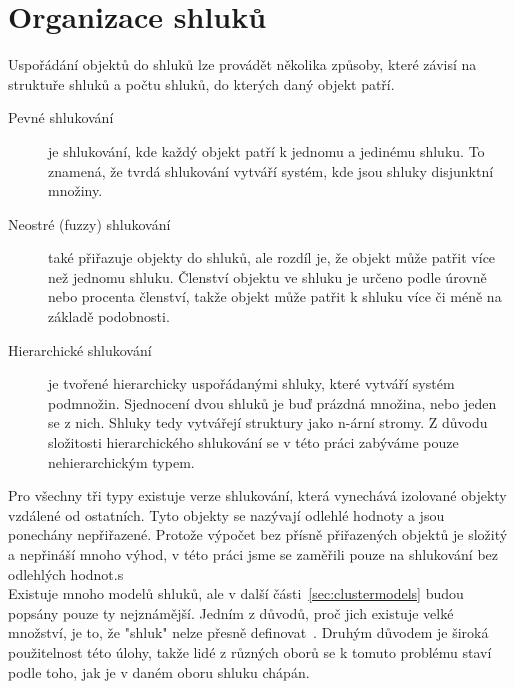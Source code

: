 \section{Organizace shluků} \label{sec:clusterorganization}
Uspořádání objektů do shluků lze provádět několika způsoby, které závisí na struktuře shluků a počtu shluků, do kterých daný objekt patří.
\begin{description}
\item[Pevné shlukování] je shlukování, kde každý objekt patří k jednomu a jedinému shluku. To znamená, že tvrdá shlukování vytváří systém, kde jsou shluky disjunktní množiny.
\item[Neostré (fuzzy) shlukování] také přiřazuje objekty do shluků, ale rozdíl je, že objekt může patřit více než jednomu shluku. Členství objektu ve shluku je určeno podle úrovně nebo procenta členství, takže objekt může patřit k shluku více či méně na základě podobnosti.
\item[Hierarchické shlukování] je tvořené hierarchicky uspořádanými shluky, které vytváří systém podmnožin. Sjednocení dvou shluků je buď prázdná množina, nebo jeden se z nich. Shluky tedy vytvářejí struktury jako n-ární stromy. Z důvodu složitosti hierarchického shlukování se v této práci zabýváme pouze nehierarchickým typem.
\end{description}
Pro všechny tři typy existuje verze shlukování, která vynechává izolované objekty vzdálené od ostatních. Tyto objekty se nazývají odlehlé hodnoty a jsou ponechány nepřiřazené. Protože výpočet bez přísně přiřazených objektů je složitý a nepřináší mnoho výhod, v této práci jsme se zaměřili pouze na shlukování bez odlehlých hodnot.s\\

Existuje mnoho modelů shluků, ale v další části~\ref{sec:clustermodels} budou popsány pouze ty nejznámější. Jedním z důvodů, proč jich existuje velké množství, je to, že "shluk" nelze přesně definovat~\cite{EstivillCastro02}. Druhým důvodem je široká použitelnost této úlohy, takže lidé z různých oborů se k tomuto problému staví podle toho, jak je v daném oboru shluku chápán.\\

